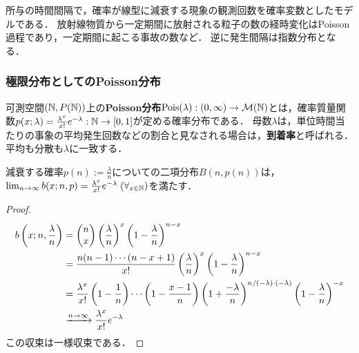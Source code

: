 \documentclass[uplatex,dvipdfmx]{jsreport}
\begin{document}
\begin{tcolorbox}[colframe=ForestGreen, colback=ForestGreen!10!white,breakable,colbacktitle=ForestGreen!40!white,coltitle=black,fonttitle=\bfseries\sffamily,
title=極限分布のお手本]
    所与の時間間隔で，確率が線型に減衰する現象の観測回数を確率変数としたモデルである．
    放射線物質から一定期間に放射される粒子の数の経時変化はPoisson過程であり，一定期間に起こる事故の数など．
    逆に発生間隔は指数分布となる．
\end{tcolorbox}

\subsubsection{極限分布としてのPoisson分布}

\begin{definition}
    可測空間$(\mathbb{N},P(\mathbb{N}))$上の\textbf{Poisson分布}$\mathrm{Pois}(\lambda):(0,\infty)\to\mathcal{M}(\mathbb{N})$とは，確率質量関数$p(x;\lambda)=\frac{\lambda^x}{x!}e^{-\lambda}:\mathbb{N}\to[0,1]$が定める確率分布である．
    母数$\lambda$は，単位時間当たりの事象の平均発生回数などの割合と見なされる場合は，\textbf{到着率}と呼ばれる．
    平均も分散も$\lambda$に一致する．
\end{definition}

\begin{proposition}
    減衰する確率$p(n):=\frac{\lambda}{n}$についての二項分布$B(n,p(n))$は，$\lim_{n\to\infty}b(x;n,p)=\frac{\lambda^x}{x!}e^{-\lambda}\;(\forall_{x\in\mathbb{N}})$を満たす．
\end{proposition}
\begin{proof}
    \begin{align*}
        b\left(x;n,\frac{\lambda}{n}\right)&=\begin{pmatrix}n\\x\end{pmatrix}\left(\frac{\lambda}{n}\right)^x\left(1-\frac{\lambda}{n}\right)^{n-x}\\
        &=\frac{n(n-1)\cdots (n-x+1)}{x!}\left(\frac{\lambda}{n}\right)^x\left(1-\frac{\lambda}{n}\right)^{n-x}\\
        &=\frac{\lambda^x}{x!}\left(1-\frac{1}{n}\right)\cdots\left(1-\frac{x-1}{n}\right)\left(1+\frac{-\lambda}{n}\right)^{n/(-\lambda)\cdot(-\lambda)}\left(1-\frac{\lambda}{n}\right)^{-x}\\
        &\xrightarrow{n\to\infty}\frac{\lambda^x}{x!}e^{-\lambda}
    \end{align*}
    この収束は一様収束である．
\end{proof}
\end{document}
